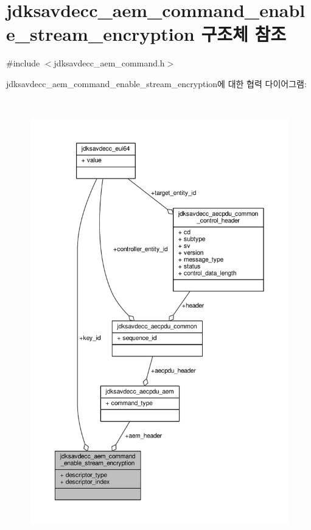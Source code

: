 \hypertarget{structjdksavdecc__aem__command__enable__stream__encryption}{}\section{jdksavdecc\+\_\+aem\+\_\+command\+\_\+enable\+\_\+stream\+\_\+encryption 구조체 참조}
\label{structjdksavdecc__aem__command__enable__stream__encryption}


{\ttfamily \#include $<$jdksavdecc\+\_\+aem\+\_\+command.\+h$>$}



jdksavdecc\+\_\+aem\+\_\+command\+\_\+enable\+\_\+stream\+\_\+encryption에 대한 협력 다이어그램\+:
\nopagebreak
\begin{figure}[H]
\begin{center}
\leavevmode
\includegraphics[height=550pt]{structjdksavdecc__aem__command__enable__stream__encryption__coll__graph}
\end{center}
\end{figure}
